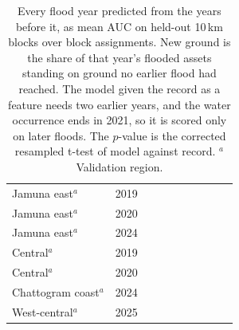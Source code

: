 \documentclass[10pt,a4paper,twocolumn]{article}
\begin{document}
\begin{table}[tp]
\begin{tabular}{llrrcccccc}
Jamuna east$^{a}$ & 2019 & \JamunaRollNineteenYears{} & \JamunaRollNineteenNewGround{} & \JamunaRollNineteenRecord{} & \JamunaRollNineteenModel{} & \JamunaRollNineteenBoth{} & \JamunaRollNineteenMap{} & \JamunaRollNineteenOcc{} & \JamunaRollNineteenPTab{} \\
Jamuna east$^{a}$ & 2020 & \JamunaRollTwentyYears{} & \JamunaRollTwentyNewGround{} & \JamunaRollTwentyRecord{} & \JamunaRollTwentyModel{} & \JamunaRollTwentyBoth{} & \JamunaRollTwentyMap{} & \JamunaRollTwentyOcc{} & \JamunaRollTwentyPTab{} \\
Jamuna east$^{a}$ & 2024 & \JamunaRollTwentyFourYears{} & \JamunaRollTwentyFourNewGround{} & \JamunaRollTwentyFourRecord{} & \JamunaRollTwentyFourModel{} & \JamunaRollTwentyFourBoth{} & \JamunaRollTwentyFourMap{} & \JamunaRollTwentyFourOcc{} & \JamunaRollTwentyFourPTab{} \\
Central$^{a}$ & 2019 & \CentralRollNineteenYears{} & \CentralRollNineteenNewGround{} & \CentralRollNineteenRecord{} & \CentralRollNineteenModel{} & \CentralRollNineteenBoth{} & \CentralRollNineteenMap{} & \CentralRollNineteenOcc{} & \CentralRollNineteenPTab{} \\
Central$^{a}$ & 2020 & \CentralRollTwentyYears{} & \CentralRollTwentyNewGround{} & \CentralRollTwentyRecord{} & \CentralRollTwentyModel{} & \CentralRollTwentyBoth{} & \CentralRollTwentyMap{} & \CentralRollTwentyOcc{} & \CentralRollTwentyPTab{} \\
Chattogram coast$^{a}$ & 2024 & \ChattogramRollTwentyFourYears{} & \ChattogramRollTwentyFourNewGround{} & \ChattogramRollTwentyFourRecord{} & \ChattogramRollTwentyFourModel{} & \ChattogramRollTwentyFourBoth{} & \ChattogramRollTwentyFourMap{} & \ChattogramRollTwentyFourOcc{} & \ChattogramRollTwentyFourPTab{} \\
West-central$^{a}$ & 2025 & \WestCentralRollTwentyFiveYears{} & \WestCentralRollTwentyFiveNewGround{} & \WestCentralRollTwentyFiveRecord{} & \WestCentralRollTwentyFiveModel{} & \WestCentralRollTwentyFiveBoth{} & \WestCentralRollTwentyFiveMap{} & \WestCentralRollTwentyFiveOcc{} & \WestCentralRollTwentyFivePTab{} \\
\bottomrule
\end{tabular}
\caption{Every flood year predicted from the years before it, as mean AUC on held-out 10\,km blocks over \RRBenchSeeds{} block assignments. New ground is the share of that year's flooded assets standing on ground no earlier flood had reached. The model given the record as a feature needs two earlier years, and the water occurrence ends in 2021, so it is scored only on later floods. The $p$-value is the corrected resampled t-test of model against record. $^{a}$Validation region.}
\label{tab:rolling}
\end{table}
\end{document}
